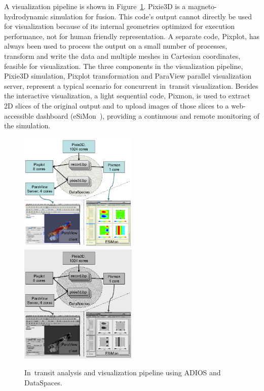 
A visualization pipeline is shown in Figure~\ref{part3-ch5-adios:fig:intransitviz}. Pixie3D \cite{ADIOS:Chacon:2002} is a  magneto-hydrodynamic simulation for fusion. This code's output cannot directly be used for visualization because of its internal geometries optimized for execution performance, not for human friendly representation. A separate code, Pixplot, has always been used to process the output on a small number of processes, transform and write the data and multiple meshes in Cartesian coordinates, feasible for visualization. The three components in the visualization pipeline, Pixie3D simulation, Pixplot transformation and ParaView parallel visualization server, represent a typical scenario for concurrent in~transit visualization. Besides the interactive visualization, a light sequential code, Pixmon, is used to extract 2D slices of the original output and to upload images of those slices to a web-accessible dashboard (eSiMon~\cite{ADIOS:Tchoua:cts12}), providing a continuous and remote monitoring of the simulation.


\begin{figure}[h!]
\centering
\myIfColor
{
\includegraphics[width=0.5\textwidth]{Chapters/part3-ch5-adios/figs/intransitviz.png}
}
{
\includegraphics[width=0.5\textwidth]{Chapters/part3-ch5-adios/figs/intransitviz-bw.png}
}
\caption[]
{In~transit analysis and visualization pipeline using ADIOS and DataSpaces.
}
\label{part3-ch5-adios:fig:intransitviz}
\end{figure}

